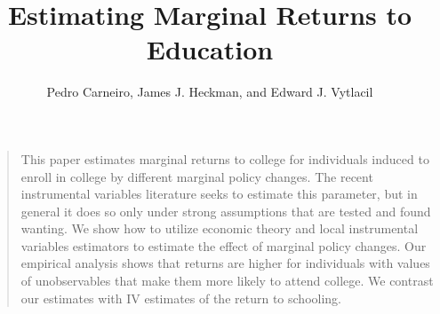 

\title{Estimating Marginal Returns to Education}
\author{Pedro Carneiro, James J. Heckman, and Edward J. Vytlacil}

\date{}

\let\otp\titlepage


\maketitle

 \begin{frame}
\begin{quote} This paper estimates marginal returns to college for individuals induced to enroll in college by different marginal policy changes. The recent instrumental variables literature seeks to estimate this parameter, but in general it does so only under strong assumptions that are tested and found wanting. We show how to utilize economic theory and local instrumental variables estimators to estimate the effect of marginal policy changes. Our empirical analysis shows that returns are higher for individuals with values of unobservables that make them more likely to attend college. We contrast our estimates with IV estimates of the return to schooling.
\end{quote}
 \end{frame}


\begin{frame}\begin{center}\begin{figure}[htp]\centering
{}
\end{figure}\end{center}\end{frame}

\begin{frame}\begin{center}\begin{figure}[htp]\centering
{}
\end{figure}\end{center}\end{frame}

\begin{frame}\begin{center}\begin{figure}[htp]\centering
{}
\end{figure}\end{center}\end{frame}


